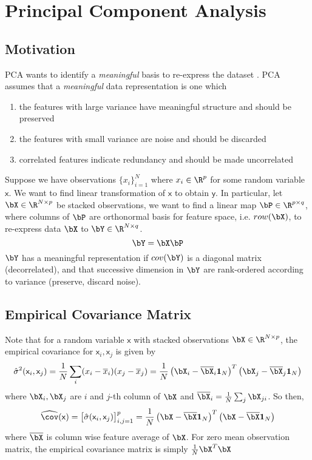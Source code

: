 \documentclass[11pt]{article}
\newcommand\ry{\ensuremath{\mathsf{y}}}
\newcommand\rx{\ensuremath{\mathsf{x}}}
\begin{document}
\section{Principal Component Analysis}

\subsection{Motivation} 

PCA wants to identify a \textit{meaningful} basis to re-express the dataset \cite{shlensTutorialPrincipalComponent2014}. PCA assumes that a \textit{meaningful} data representation is one which
\begin{enumerate}
    \item the features with large variance have meaningful structure and should be preserved
    \item the features with small variance are noise and should be discarded
    \item correlated features indicate redundancy and should be made uncorrelated
\end{enumerate}
Suppose we have observations $\{x_i\}_{i=1}^N$ where $x_i\in \R^p$ for some random variable $\rx$. We want to find linear transformation of $\rx$ to obtain $\ry$. In particular, let $\bX \in \R^{N\times p}$ be stacked observations, we want to find a linear map $\bP \in \R^{p\times q}$, where columns of $\bP$ are orthonormal basis for feature space, i.e. $row(\bX)$, to re-express data $\bX$ to $\bY \in \R^{N\times q}$.
\[
    \bY = \bX \bP    
\]
$\bY$ has a meaningful representation if $cov(\bY)$ is a diagonal matrix (decorrelated), and that successive dimension in $\bY$ are rank-ordered according to variance (preserve, discard noise). 

\subsection{Empirical Covariance Matrix}

Note that for a random variable $\rx$ with stacked observations $\bX\in\R^{N\times p}$, the empirical covariance for $\rx_i,\rx_j$ is given by 
\[
    \hat{\sigma}^2(\rx_i,\rx_j)
    = \frac{1}{N} \sum_i (x_i-\overline{x}_i)(x_j-\overline{x}_j) 
    = \frac{1}{N} \left( \bX_i - \overline{\bX}_i \mathbf{1}_N \right)^T \left( \bX_j - \overline{\bX}_j \mathbf{1}_N \right)
\]
where $\bX_i,\bX_j$ are $i$ and $j$-th column of $\bX$ and $\overline{\bX}_i = \frac{1}{N} \sum_j \bX_{ji}$. So then,
\[
    \widehat{\cov}(\rx) 
    = \begin{bmatrix}
        \hat{\sigma}(\rx_i,\rx_j)
    \end{bmatrix}_{i,j=1}^p
    = \frac{1}{N} \left( \bX - \overline{\bX} \mathbf{1}_N \right)^T \left( \bX - \overline{\bX} \mathbf{1}_N \right)
\]
where $\overline{\bX}$ is column wise feature average of $\bX$. For zero mean observation matrix, the empirical covariance matrix is simply $\frac{1}{N} \bX^T \bX$
\end{document}
